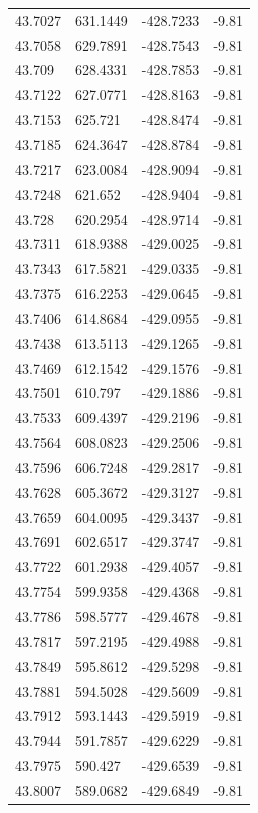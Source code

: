 \begin{table}[H]
\begin{tabular}{llll}
43.7027 & 631.1449 & -428.7233 & -9.81 \\
43.7058 & 629.7891 & -428.7543 & -9.81 \\
43.709 & 628.4331 & -428.7853 & -9.81 \\
43.7122 & 627.0771 & -428.8163 & -9.81 \\
43.7153 & 625.721 & -428.8474 & -9.81 \\
43.7185 & 624.3647 & -428.8784 & -9.81 \\
43.7217 & 623.0084 & -428.9094 & -9.81 \\
43.7248 & 621.652 & -428.9404 & -9.81 \\
43.728 & 620.2954 & -428.9714 & -9.81 \\
43.7311 & 618.9388 & -429.0025 & -9.81 \\
43.7343 & 617.5821 & -429.0335 & -9.81 \\
43.7375 & 616.2253 & -429.0645 & -9.81 \\
43.7406 & 614.8684 & -429.0955 & -9.81 \\
43.7438 & 613.5113 & -429.1265 & -9.81 \\
43.7469 & 612.1542 & -429.1576 & -9.81 \\
43.7501 & 610.797 & -429.1886 & -9.81 \\
43.7533 & 609.4397 & -429.2196 & -9.81 \\
43.7564 & 608.0823 & -429.2506 & -9.81 \\
43.7596 & 606.7248 & -429.2817 & -9.81 \\
43.7628 & 605.3672 & -429.3127 & -9.81 \\
43.7659 & 604.0095 & -429.3437 & -9.81 \\
43.7691 & 602.6517 & -429.3747 & -9.81 \\
43.7722 & 601.2938 & -429.4057 & -9.81 \\
43.7754 & 599.9358 & -429.4368 & -9.81 \\
43.7786 & 598.5777 & -429.4678 & -9.81 \\
43.7817 & 597.2195 & -429.4988 & -9.81 \\
43.7849 & 595.8612 & -429.5298 & -9.81 \\
43.7881 & 594.5028 & -429.5609 & -9.81 \\
43.7912 & 593.1443 & -429.5919 & -9.81 \\
43.7944 & 591.7857 & -429.6229 & -9.81 \\
43.7975 & 590.427 & -429.6539 & -9.81 \\
43.8007 & 589.0682 & -429.6849 & -9.81 \\

\end{tabular}
\end{table}

